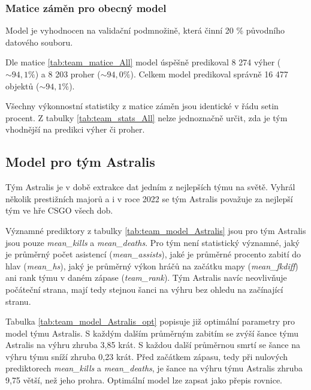 




\subsubsection{Matice záměn pro obecný model}
Model je vyhodnocen na validační podmnožině, která činní 20 \% původního datového souboru.



Dle matice \ref{tab:team_matice_All} model úspěšně predikoval 8 274 výher ($\sim 94,1 \%$) a 8 203 proher ($\sim 94,0 \%$). Celkem
model predikoval správně 16 477 objektů ($\sim 94,1 \%$).



Všechny výkonnostní statistiky z matice záměn jsou identické v řádu setin procent. Z tabulky \ref{tab:team_stats_All} nelze jednoznačně určit, zda je tým
vhodnější na predikci výher či proher.

\subsection{Model pro tým Astralis}
Tým Astralis je v době extrakce dat jedním z nejlepších týmu na světě. Vyhrál několik prestižních majorů a i v roce 2022 se tým Astralis považuje za nejlepší tým
ve hře \ac{CSGO} všech dob.



Významné prediktory z tabulky \ref{tab:team_model_Astralis} jsou pro tým Astralis jsou pouze \textit{mean\_kills} a \textit{mean\_deaths}.  Pro tým
není statistický významné, jaký je průměrný počet asistencí (\textit{mean\_assists}), jaké je průměrné procento zabití do hlav (\textit{mean\_hs}), jaký je
průměrný výkon hráčů na začátku mapy (\textit{mean\_fkdiff}) ani rank týmu v daném zápase (\textit{team\_rank}). Tým Astralis navíc neovlivňuje počáteční strana,
mají tedy stejnou šanci na výhru bez ohledu na začínající stranu.



Tabulka \ref{tab:team_model_Astralis_opt} popisuje již optimální parametry pro model týmu Astralis. S každým dalším průměrným zabitím se zvýší šance
týmu Astralis na výhru zhruba 3,85 krát. S každou další průměrnou smrtí se šance na výhru týmu sníží zhruba 0,23 krát. 
Před začátkem zápasu, tedy při nulových prediktorech \textit{mean\_kills} a \textit{mean\_deaths}, je šance na výhru týmu Astralis zhruba 9,75 větší, než jeho
prohra. Optimální model lze zapsat jako přepis rovnice.


